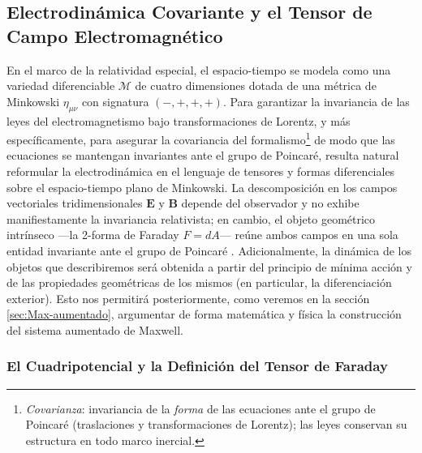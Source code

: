 \subsection{Electrodinámica Covariante y el Tensor de Campo Electromagnético}
\label{sec:Elec_Cov}

\primerparrafo En el marco de la relatividad especial, el espacio-tiempo se modela como una variedad diferenciable $\mathcal{M}$ de cuatro dimensiones dotada de una métrica de Minkowski $\eta_{\mu\nu}$ con signatura $(-,+,+,+)$. Para garantizar la invariancia de las leyes del electromagnetismo bajo transformaciones de Lorentz, y más específicamente, para asegurar la covariancia del formalismo\footnote{\emph{Covarianza}: invariancia de la \emph{forma} de las ecuaciones ante el grupo de Poincaré (traslaciones y transformaciones de Lorentz); las leyes conservan su estructura en todo marco inercial.} de modo que las ecuaciones se mantengan invariantes ante el grupo de Poincaré, resulta natural reformular la electrodinámica en el lenguaje de tensores y formas diferenciales sobre el espacio-tiempo plano de Minkowski. La descomposición en los campos vectoriales tridimensionales $\mathbf{E}$ y $\mathbf{B}$ depende del observador y no exhibe manifiestamente la invariancia relativista; en cambio, el objeto geométrico intrínseco ---la 2-forma de Faraday $F=dA$--- reúne ambos campos en una sola entidad invariante ante el grupo de Poincaré \parencite{baez-muniain-1994, hehl-obukhov-2003}. Adicionalmente, la dinámica de los objetos que describiremos será obtenida a partir del principio de mínima acción y de las propiedades geométricas de los mismos (en particular, la diferenciación exterior). Esto nos permitirá posteriormente, como veremos en la sección \ref{sec:Max-aumentado}, argumentar de forma matemática y física la construcción del sistema aumentado de Maxwell.

\subsubsection{El Cuadripotencial y la Definición del Tensor de Faraday}

